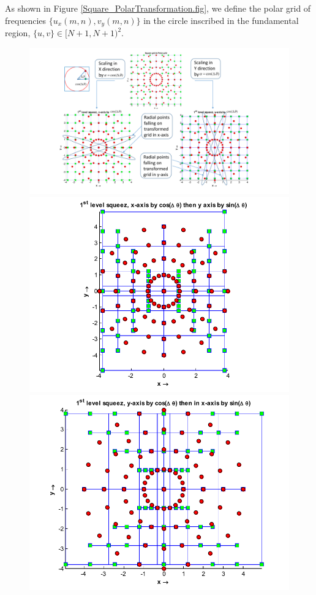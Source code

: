 \documentclass{UCF_ETD}
\begin{document}
  As shown in  Figure \ref{Square_PolarTransformation.fig}, we define the polar grid of frequencies $\{u_x(m,n), v_y(m,n)\}$ in the circle inscribed in the fundamental region, $\{u,v\} \in [N+1,N+1)^2$.
  \begin{figure}[H]
 \begin{center}
 \includegraphics[scale=0.6]{PolarSphericalDFT/Square_PolarTransformation}
 \includegraphics[scale=0.6]{PolarSphericalDFT/FirstLevelXGrid}
 \includegraphics[scale=0.6]{PolarSphericalDFT/FirstLevelYGrid}

\end{center}
\end{figure}
\end{document}
